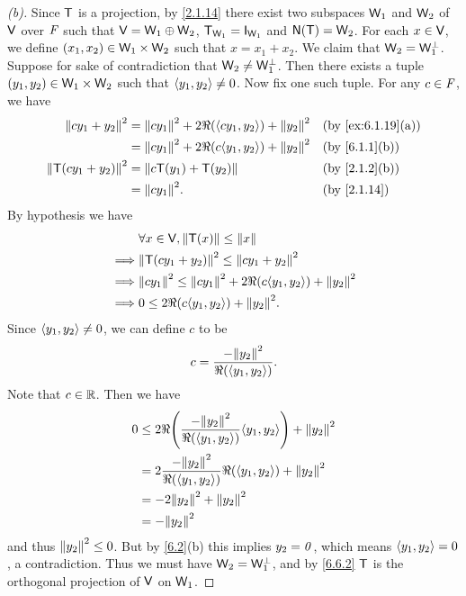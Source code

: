 \begin{proof}[(b)]
  Since \(\mathsf{T}\) is a projection, by \cref{2.1.14} there exist two subspaces \(\mathsf{W}_1\) and \(\mathsf{W}_2\) of \(\mathsf{V}\) over \(\mathit{F}\) such that \(\mathsf{V} = \mathsf{W}_1 \oplus \mathsf{W}_2\), \(\T_{\W_1} = \IT[\W_1]\) and \(\ns{\T} = \W_2\).
  For each \(x \in \mathsf{V}\), we define \((x_1, x_2) \in \mathsf{W}_1 \times \mathsf{W}_2\) such that \(x = x_1 + x_2\).
  We claim that \(\mathsf{W}_2 = \mathsf{W}_1^{\perp}\).
  Suppose for sake of contradiction that \(\mathsf{W}_2 \neq \mathsf{W}_1^{\perp}\).
  Then there exists a tuple \((y_1, y_2) \in \mathsf{W}_1 \times \mathsf{W}_2\) such that \(\left\langle y_1, y_2\right\rangle \neq 0\).
  Now fix one such tuple.
  For any \(c \in \mathit{F}\), we have
  \begin{align*}
    \norm{c y_1 + y_2}^2     & = \norm{c y_1}^2 + 2 \Re(\inn{c y_1, y_2}) + \norm{y_2}^2 &  & \by{ex:6.1.19}[a] \\
                             & = \norm{c y_1}^2 + 2 \Re(c \inn{y_1, y_2}) + \norm{y_2}^2 &  & \by{6.1.1}[b]     \\
    \norm{\T(c y_1 + y_2)}^2 & = \norm{c \T(y_1) + \T(y_2)}                              &  & \by{2.1.2}[b]     \\
                             & = \norm{c y_1}^2.                                         &  & \by{2.1.14}
  \end{align*}
  By hypothesis we have
  \begin{align*}
             & \forall x \in \V, \norm{\T(x)} \leq \norm{x}                                \\
    \implies & \norm{\T(c y_1 + y_2)}^2 \leq \norm{c y_1 + y_2}^2                          \\
    \implies & \norm{c y_1}^2 \leq \norm{c y_1}^2 + 2 \Re(c \inn{y_1, y_2}) + \norm{y_2}^2 \\
    \implies & 0 \leq 2 \Re(c \inn{y_1, y_2}) + \norm{y_2}^2.
  \end{align*}
  Since \(\left\langle y_1, y_2\right\rangle \neq 0\), we can define \(c\) to be
  \[
    c = \dfrac{-\norm{y_2}^2}{\Re(\inn{y_1, y_2})}.
  \]
  Note that \(c \in \mathbb{R}\).
  Then we have
  \begin{align*}
    0 & \leq 2 \Re\pa{\dfrac{-\norm{y_2}^2}{\Re(\inn{y_1, y_2})} \inn{y_1, y_2}} + \norm{y_2}^2 \\
      & = 2 \dfrac{-\norm{y_2}^2}{\Re(\inn{y_1, y_2})} \Re\pa{\inn{y_1, y_2}} + \norm{y_2}^2    \\
      & = - 2 \norm{y_2}^2 + \norm{y_2}^2                                                       \\
      & = - \norm{y_2}^2
  \end{align*}
  and thus \(\left\lVert y_2\right\rVert^2 \leq 0\).
  But by \cref{6.2}(b) this implies \(y_2 = \mathit{0}\), which means \(\left\langle y_1, y_2\right\rangle = 0\), a contradiction.
  Thus we must have \(\mathsf{W}_2 = \mathsf{W}_1^{\perp}\), and by \cref{6.6.2} \(\mathsf{T}\) is the orthogonal projection of \(\mathsf{V}\) on \(\mathsf{W}_1\).
\end{proof}

